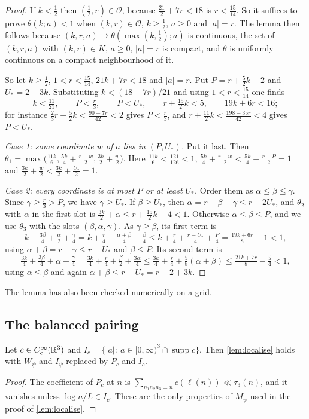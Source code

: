 \documentclass[11pt,colorlinks]{charlie}
\begin{document}
\begin{proof}
If $k<\frac12$ then $(\frac12,r)\in\mathcal O$, because $\frac{21}2+7r<18$ is $r<\frac{15}{14}$. So it suffices to prove $\theta(k;a)<1$ when $(k,r)\in\mathcal O$, $k\ge\frac12$, $a\ge0$ and $|a|=r$. The lemma then follows because $(k,r,a)\mapsto\theta(\max(k,\frac12);a)$ is continuous, the set of $(k,r,a)$ with $(k,r)\in K$, $a\ge0$, $|a|=r$ is compact, and $\theta$ is uniformly continuous on a compact neighbourhood of it.

So let $k\ge\frac12$, $1<r<\frac{15}{14}$, $21k+7r<18$ and $|a|=r$. Put $P=r+\frac52k-2$ and $U_*=2-3k$. Substituting $k<(18-7r)/21$ and using $1<r<\frac{15}{14}$ one finds
\[
 k<\tfrac{11}{21},\qquad P<\tfrac r3,\qquad P<U_*,\qquad r+\tfrac{15}2k<5,\qquad 19k+6r<16 ;
\]
for instance $\frac23r+\frac52k<\frac{90-7r}{42}<2$ gives $P<\frac r3$, and $r+\frac{11}2k<\frac{198-35r}{42}<4$ gives $P<U_*$.

\emph{Case 1: some coordinate $w$ of $a$ lies in $(P,U_*)$.} Put it last. Then $\theta_1=\max\big(\frac{11k}6,\frac{5k}4+\frac{r-w}2,\frac{3k}2+\frac w2\big)$. Here $\frac{11k}6<\frac{121}{126}<1$, $\frac{5k}4+\frac{r-w}2<\frac{5k}4+\frac{r-P}2=1$ and $\frac{3k}2+\frac w2<\frac{3k}2+\frac{U_*}2=1$.

\emph{Case 2: every coordinate is at most $P$ or at least $U_*$.} Order them as $\alpha\le\beta\le\gamma$. Since $\gamma\ge\frac r3>P$, we have $\gamma\ge U_*$. If $\beta\ge U_*$, then $\alpha=r-\beta-\gamma\le r-2U_*$, and $\theta_2$ with $\alpha$ in the first slot is $\frac{3k}2+\alpha\le r+\frac{15}2k-4<1$. Otherwise $\alpha\le\beta\le P$, and we use $\theta_3$ with the slots $(\beta,\alpha,\gamma)$. As $\gamma\ge\beta$, its first term is
\[
 k+\tfrac{3\beta}4+\tfrac\alpha2+\tfrac\gamma4=k+\tfrac r4+\tfrac{\alpha+\beta}4+\tfrac\beta4\le k+\tfrac r4+\tfrac{r-U_*}4+\tfrac P4=\tfrac{19k+6r}8-1<1,
\]
using $\alpha+\beta=r-\gamma\le r-U_*$ and $\beta\le P$. Its second term is
\[
 \tfrac{3k}4+\tfrac{3\beta}4+\alpha+\tfrac\gamma4=\tfrac{3k}4+\tfrac r4+\tfrac\beta2+\tfrac{3\alpha}4\le\tfrac{3k}4+\tfrac r4+\tfrac58(\alpha+\beta)\le\tfrac{21k+7r}8-\tfrac54<1,
\]
using $\alpha\le\beta$ and again $\alpha+\beta\le r-U_*=r-2+3k$.
\end{proof}
\noindent The lemma has also been checked numerically on a grid.

\subsection{The balanced pairing}
\begin{lemma}[Localisation]\label{lem:localiseP}
Let $c\in C_c^\infty(\mathbb{R}^3)$ and $I_c=\{|a|:\ a\in[0,\infty)^3\cap\operatorname{supp}c\}$. Then \cref{lem:localise} holds with $W_\psi$ and $I_\psi$ replaced by $P_c$ and $I_c$.
\end{lemma}
\begin{proof}
The coefficient of $P_c$ at $n$ is $\sum_{n_1n_2n_3=n}c(\ell(n))\ll\tau_3(n)$, and it vanishes unless $\log n/L\in I_c$. These are the only properties of $M_\psi$ used in the proof of \cref{lem:localise}.
\end{proof}
\end{document}
